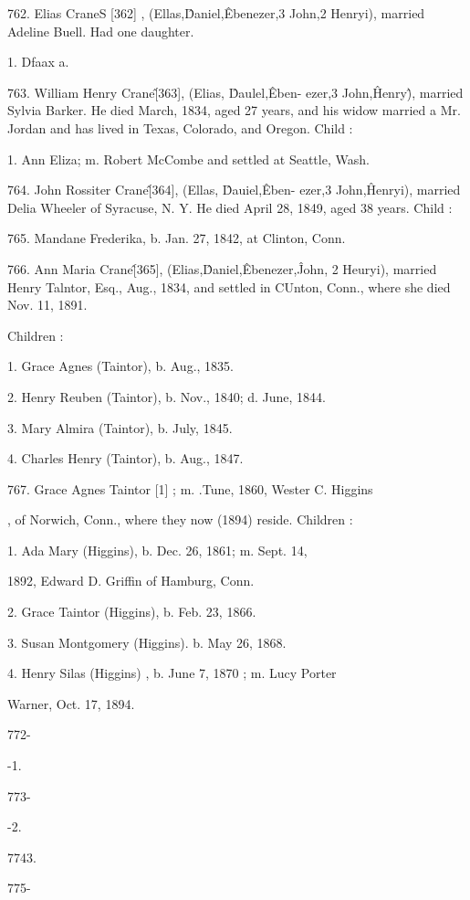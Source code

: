 \documentclass{book}
\begin{document}
762. Elias CraneS [362] , (Ellas,\^ Daniel,\^ Ebenezer,3 John,2 
Henryi), married Adeline Buell. Had one daughter. 

1. Dfaax a. 

763. William Henry Crane\^ [363], (Elias, \^ Daulel,\^ Eben- 
ezer,3 John,\^ Henry\^), married Sylvia Barker. He died March, 
1834, aged 27 years, and his widow married a Mr. Jordan and 
has lived in Texas, Colorado, and Oregon. Child : 

1. Ann Eliza; m. Robert McCombe and settled at Seattle, Wash. 

764. John Rossiter Crane\^ [364], (Ellas, \^ Dauiel,\^ Eben- 
ezer,3 John,\^ Henryi), married Delia Wheeler of Syracuse, N. Y. 
He died April 28, 1849, aged 38 years. Child : 

765. Mandane Frederika, b. Jan. 27, 1842, at Clinton, Conn. 

766. Ann Maria Crane\^ [365], (Elias,\^ Daniel,\^ Ebenezer,\^ 
John, 2 Heuryi), married Henry Talntor, Esq., Aug., 1834, and 
settled in CUnton, Conn., where she died Nov. 11, 1891. 

Children : 

1. Grace Agnes (Taintor), b. Aug., 1835. 

2. Henry Reuben (Taintor), b. Nov., 1840; d. June, 1844. 

3. Mary Almira (Taintor), b. July, 1845. 

4. Charles Henry (Taintor), b. Aug., 1847. 

767. Grace Agnes Taintor [1] ; m. .Tune, 1860, Wester C. Higgins 

, of Norwich, Conn., where they now (1894) reside. Children : 

1. Ada Mary (Higgins), b. Dec. 26, 1861; m. Sept. 14, 

1892, Edward D. Griffin of Hamburg, Conn. 

2. Grace Taintor (Higgins), b. Feb. 23, 1866. 

3. Susan Montgomery (Higgins). b. May 26, 1868. 

4. Henry Silas (Higgins) , b. June 7, 1870 ; m. Lucy Porter 

Warner, Oct. 17, 1894. 



772- 


-1. 


773- 


-2. 


7743. 


775- 
\end{document}
